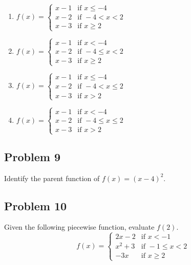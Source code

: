 \documentclass[12pt]{article}
\begin{document}
\begin{enumerate}[label=(\alph*)]
    \item $f(x) = \begin{cases} 
          x - 1 & \text{if } x \leq -4 \\ 
          x - 2 & \text{if } -4 < x < 2 \\ 
          x - 3 & \text{if } x \geq 2 
          \end{cases}$
          
    \item $f(x) = \begin{cases} 
          x - 1 & \text{if } x < -4 \\ 
          x - 2 & \text{if } -4 \leq x < 2 \\ 
          x - 3 & \text{if } x \geq 2 
          \end{cases}$
          
    \item $f(x) = \begin{cases} 
          x - 1 & \text{if } x \leq -4 \\ 
          x - 2 & \text{if } -4 < x \leq 2 \\ 
          x - 3 & \text{if } x > 2 
          \end{cases}$
          
    \item $f(x) = \begin{cases} 
          x - 1 & \text{if } x < -4 \\ 
          x - 2 & \text{if } -4 \leq x \leq 2 \\ 
          x - 3 & \text{if } x > 2 
          \end{cases}$
\end{enumerate}

\subsection*{Problem 9}
Identify the parent function of \(f(x)=(x-4)^2\).

\subsection*{Problem 10}
Given the following piecewise function, evaluate \(f(2)\).
\[
f(x) = 
\begin{cases} 
2x - 2 & \text{if } x < -1 \\ 
x^2 + 3 & \text{if } -1 \leq x < 2 \\ 
-3x & \text{if } x \geq 2 
\end{cases}
\]
\end{document}
